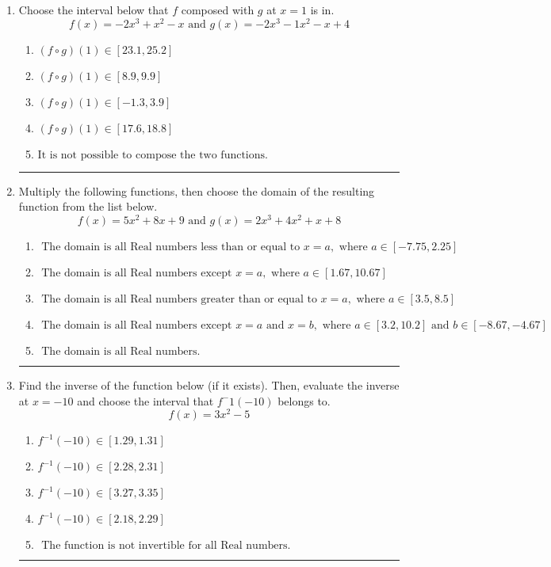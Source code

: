 \documentclass[14pt]{extbook}
\newcommand{\litem}[1]{\item#1\hspace*{-1cm}\rule{\textwidth}{0.4pt}}
\begin{document}
\begin{enumerate}
{\begin{enumerate}[label=\Alph*.]
\end{enumerate} }
\litem{
Choose the interval below that $f$ composed with $g$ at $x=1$ is in.\[ f(x) = -2x^{3} + x^{2} -x \text{ and } g(x) = -2x^{3} -1 x^{2} -x + 4 \]\begin{enumerate}[label=\Alph*.]
\item \( (f \circ g)(1) \in [23.1, 25.2] \)
\item \( (f \circ g)(1) \in [8.9, 9.9] \)
\item \( (f \circ g)(1) \in [-1.3, 3.9] \)
\item \( (f \circ g)(1) \in [17.6, 18.8] \)
\item \( \text{It is not possible to compose the two functions.} \)

\end{enumerate} }
\litem{
Multiply the following functions, then choose the domain of the resulting function from the list below.\[ f(x) = 5x^{2} +8 x + 9 \text{ and } g(x) = 2x^{3} +4 x^{2} +x + 8 \]\begin{enumerate}[label=\Alph*.]
\item \( \text{ The domain is all Real numbers less than or equal to } x = a, \text{ where } a \in [-7.75, 2.25] \)
\item \( \text{ The domain is all Real numbers except } x = a, \text{ where } a \in [1.67, 10.67] \)
\item \( \text{ The domain is all Real numbers greater than or equal to } x = a, \text{ where } a \in [3.5, 8.5] \)
\item \( \text{ The domain is all Real numbers except } x = a \text{ and } x = b, \text{ where } a \in [3.2, 10.2] \text{ and } b \in [-8.67, -4.67] \)
\item \( \text{ The domain is all Real numbers. } \)

\end{enumerate} }
\litem{
Find the inverse of the function below (if it exists). Then, evaluate the inverse at $x = -10$ and choose the interval that $f^-1(-10)$ belongs to.\[ f(x) = 3 x^2 - 5 \]\begin{enumerate}[label=\Alph*.]
\item \( f^{-1}(-10) \in [1.29, 1.31] \)
\item \( f^{-1}(-10) \in [2.28, 2.31] \)
\item \( f^{-1}(-10) \in [3.27, 3.35] \)
\item \( f^{-1}(-10) \in [2.18, 2.29] \)
\item \( \text{ The function is not invertible for all Real numbers. } \)


\end{enumerate}}
\end{enumerate}
\end{document}
